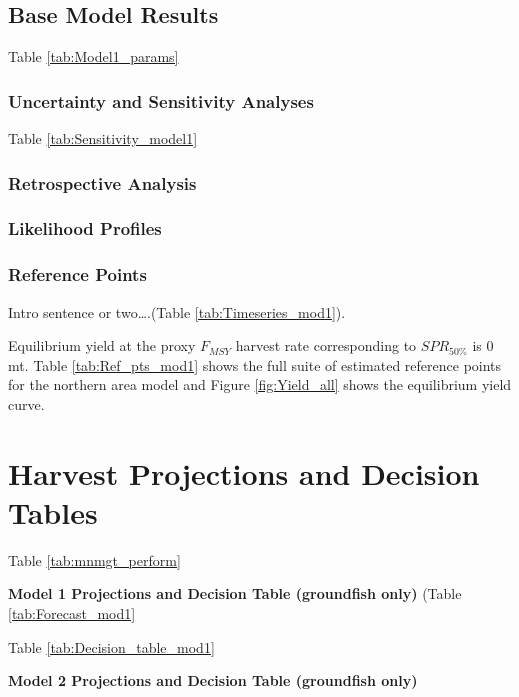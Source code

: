 \documentclass[12pt,]{article}
\begin{document}
\subsection{Base Model Results}\label{base-model-results}

Table \ref{tab:Model1_params}

\subsubsection{Uncertainty and Sensitivity
Analyses}\label{uncertainty-and-sensitivity-analyses}

Table \ref{tab:Sensitivity_model1}

\subsubsection{Retrospective Analysis}\label{retrospective-analysis}

\subsubsection{Likelihood Profiles}\label{likelihood-profiles}

\subsubsection{Reference Points}\label{reference-points-1}

Intro sentence or two\ldots{}.(Table \ref{tab:Timeseries_mod1}).

Equilibrium yield at the proxy \(F_{MSY}\) harvest rate corresponding to
\(SPR_{50\%}\) is 0 mt. Table \ref{tab:Ref_pts_mod1} shows the full
suite of estimated reference points for the northern area model and
Figure \ref{fig:Yield_all} shows the equilibrium yield curve.

\section{Harvest Projections and Decision
Tables}\label{harvest-projections-and-decision-tables}

Table \ref{tab:mnmgt_perform}

\textbf{Model 1 Projections and Decision Table (groundfish only)} (Table
\ref{tab:Forecast_mod1}

Table \ref{tab:Decision_table_mod1}

\textbf{Model 2 Projections and Decision Table (groundfish only)}
\end{document}
